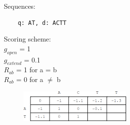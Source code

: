 \begin{multicols}{2}
Sequences:
\begin{verbatim}
    q: AT, d: ACTT
\end{verbatim}
\vfill\null
\columnbreak

\noindent
Scoring scheme: \\
\null \quad $g_{open}$ = 1 \\
\null \quad $g_{extend}$ = 0.1 \\
\null \quad $R_{ab}$ = 1 for a = b \\ 
\null \quad $R_{ab}$ = 0 for a $\neq$ b \\ 

\end{multicols} 

\begin{figure}[H]
  \centering
      \includegraphics[width=0.5\textwidth]{fig03/dp_general_gap_exercise.png}
\end{figure}

\bigskip 

%
